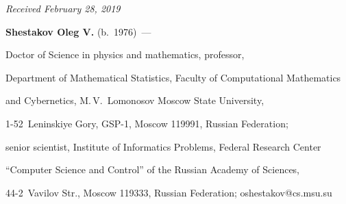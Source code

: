 \vspace*{-3pt}



\hfill{\small\textit{Received February 28, 2019}} 



\Contrl



\noindent

\textbf{Shestakov Oleg V.} (b.\ 1976)~--- 

Doctor of Science in physics and mathematics, professor, 

Department of Mathematical Statistics, Faculty of Computational Mathematics 

and Cybernetics, M.\,V.~Lomonosov Moscow State University, 

\mbox{1-52}~Leninskiye Gory, GSP-1, Moscow 119991, Russian Federation; 

senior scientist, Institute of Informatics Problems, Federal Research Center 

``Computer Science and Control'' of the Russian Academy of Sciences, 

44-2~Vavilov Str., Moscow 119333, Russian Federation; \mbox{oshestakov@cs.msu.su}

\label{end\stat}





\renewcommand{\bibname}{\protect\rm Литература}

